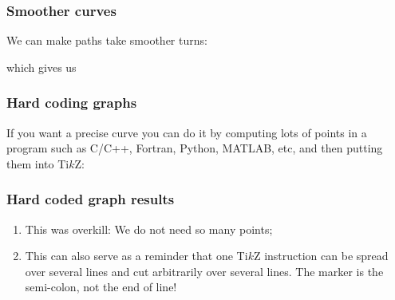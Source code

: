 %
%
\begin{frame}[fragile]
  \frametitle{
    Smoother curves
  }

  We can make paths take smoother turns:

  { \footnotesize
  
  }
  
  which gives us

  \begin{center}
    
  \end{center}

\end{frame}
%
%
\begin{frame}[containsverbatim]
  \frametitle{
    Hard coding graphs
  }

  If you want a precise curve you can do it by computing lots of points in a program such as C/C++, Fortran, Python, MATLAB, etc, and then putting them into Ti$k$Z: 

  {
    \scriptsize
    
  }
  
\end{frame}

%
%
\begin{frame}[containsverbatim]
    \frametitle{
    Hard coded graph results
    }

    

    \begin{enumerate}
    \item
      This was overkill: We do not need so many points;
    \item
      This can also serve as a reminder that one Ti$k$Z instruction can be spread over several lines and cut arbitrarily over several lines. The marker is the semi-colon, not the end of line!
    \end{enumerate}

\end{frame}

